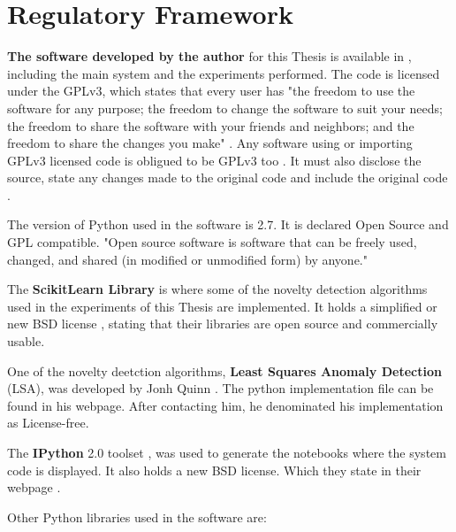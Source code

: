 


\chapter{Regulatory Framework} %

\label{AppendixB} %


\textbf{The software developed by the author} for this Thesis is available in \cite{github}, including the main system and the experiments performed. The code is licensed under the GPLv3, which states that every user has "the freedom to use the software for any purpose; the freedom to change the software to suit your needs; the freedom to share the software with your friends and neighbors; and
the freedom to share the changes you make" \cite{gnu}. Any software using or importing GPLv3 licensed code is obligued to be GPLv3 too \cite{gnu-obli}. It must also disclose the source, state any changes made to the original code and include the original code \cite{gnu-obli}.

The version of Python \cite{open_source} used in the software is 2.7. It is declared Open Source and GPL compatible. "Open source software is software that can be freely used, changed, and shared (in modified or unmodified form) by anyone." \cite{open_source}

The \textbf{ScikitLearn Library} \cite{scikit-learn} is where some of the novelty detection algorithms used in the experiments of this Thesis are implemented. It holds a simplified or new BSD license \cite{bsd}, stating that their libraries are open source and commercially usable.

One of the novelty deetction algorithms, \textbf{Least Squares Anomaly Detection} (LSA), was developed by Jonh Quinn \cite{lsa}. The python implementation file can be found in his webpage. After contacting him, he denominated his implementation as License-free. 

The \textbf{IPython} 2.0 toolset \cite{ipython}, was used to generate the notebooks where the system code is displayed. It also holds a new BSD license. Which they state in their webpage \cite{ipy_l}. 

Other Python libraries used in the software are:

